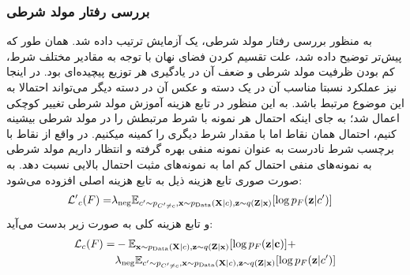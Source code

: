 	\subsubsection{بررسی رفتار مولد شرطی}
	به منظور بررسی رفتار مولد شرطی، یک آزمایش ترتیب داده شد. همان طور که پیش‌تر توضیح داده شد، علت تقسیم کردن فضای نهان با توجه به مقادیر مختلف شرط، کم بودن ظرفیت مولد شرطی و ضعف آن در یادگیری هر توزیع پیچیده‌ای بود. در اینجا نیز عملکرد نسبتا مناسب آن در یک دسته و عکس آن در دسته دیگر می‌تواند احتمالا به این موضوع مرتبط باشد. به این منظور در تابع هزینه آموزش مولد شرطی تغییر کوچکی اعمال شد؛ به جای اینکه احتمال هر نمونه با شرط مرتبطش را در مولد شرطی بیشینه کنیم، احتمال همان نقاط اما با مقدار شرط دیگری را کمینه میکنیم. در واقع از نقاط با برچسب شرط نادرست به عنوان نمونه منفی بهره گرفته و انتظار داریم مولد شرطی به نمونه‌های منفی احتمال کم اما به نمونه‌های مثبت احتمال بالایی نسبت دهد. به صورت صوری تابع هزینه ذیل به تابع هزینه اصلی افزوده می‌شود:
	\begin{align}
		\mathcal{L'}_c (F) = & \lambda_\text{neg} \mathbb E_{c' \sim p_{C'\neq c}, {\bf x} \sim p_\text{Data}({\bf X}|c), {\bf z} \sim q({\bf Z}|{\bf x})} [\log p_F({\bf z}|c')]
	\end{align}
	و تابع هزینه کلی به صورت زیر بدست می‌آید:
	\begin{align}
		\mathcal{L}_c (F) = & - \mathbb E_{{\bf x} \sim p_\text{Data}({\bf X}|c), {\bf z} \sim q({\bf Z}|{\bf x})} [\log p_F({\bf z}|{\bf c})] +                                 \\
		                    & \lambda_\text{neg} \mathbb E_{c' \sim p_{C'\neq c}, {\bf x} \sim p_\text{Data}({\bf X}|c), {\bf z} \sim q({\bf Z}|{\bf x})} [\log p_F({\bf z}|c')]
	\end{align}
